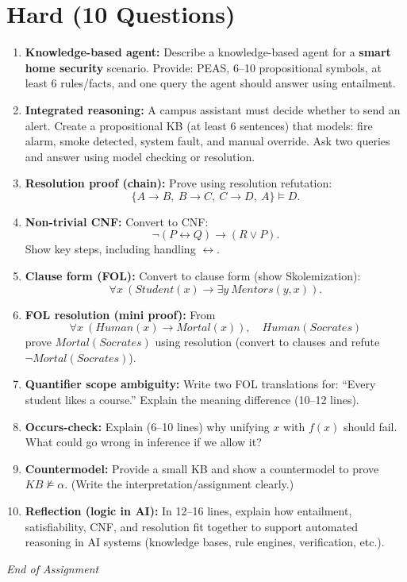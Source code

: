 \documentclass[11pt,a4paper]{article}
\begin{document}
\section*{Hard (10 Questions)}
\begin{enumerate}[label=H\arabic*., leftmargin=*]
  \item \textbf{Knowledge-based agent:} Describe a knowledge-based agent for a \textbf{smart home security} scenario.
    Provide: PEAS, 6--10 propositional symbols, at least 6 rules/facts, and one query the agent should answer using entailment.

  \item \textbf{Integrated reasoning:} A campus assistant must decide whether to send an alert.
    Create a propositional KB (at least 6 sentences) that models: fire alarm, smoke detected, system fault, and manual override.
    Ask two queries and answer using model checking or resolution.

  \item \textbf{Resolution proof (chain):} Prove using resolution refutation:
    \[
      \{A \rightarrow B,\ B \rightarrow C,\ C \rightarrow D,\ A\} \models D.
    \]

  \item \textbf{Non-trivial CNF:} Convert to CNF:
    \[
      \lnot(P \leftrightarrow Q) \rightarrow (R \lor P).
    \]
    Show key steps, including handling $\leftrightarrow$.

  \item \textbf{Clause form (FOL):} Convert to clause form (show Skolemization):
    \[
      \forall x\ (Student(x) \rightarrow \exists y\ Mentors(y,x)).
    \]

  \item \textbf{FOL resolution (mini proof):} From
    \[
      \forall x\ (Human(x) \rightarrow Mortal(x)),\quad Human(Socrates)
    \]
    prove $Mortal(Socrates)$ using resolution (convert to clauses and refute $\lnot Mortal(Socrates)$).

  \item \textbf{Quantifier scope ambiguity:} Write two FOL translations for:
    ``Every student likes a course.''
    Explain the meaning difference (10--12 lines).

  \item \textbf{Occurs-check:} Explain (6--10 lines) why unifying $x$ with $f(x)$ should fail.
    What could go wrong in inference if we allow it?

  \item \textbf{Countermodel:} Provide a small KB and show a countermodel to prove $KB \not\models \alpha$.
    (Write the interpretation/assignment clearly.)

  \item \textbf{Reflection (logic in AI):} In 12--16 lines, explain how entailment, satisfiability, CNF, and resolution
    fit together to support automated reasoning in AI systems (knowledge bases, rule engines, verification, etc.).
\end{enumerate}

\vfill
\noindent\textit{End of Assignment}
\end{document}
